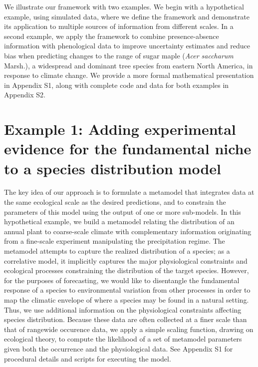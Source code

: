 \documentclass[11pt]{article}
\begin{document}
We illustrate our framework with two examples.
We begin with a hypothetical example, using simulated data, where we define the framework and demonstrate its application to multiple sources of information from different scales.
In a second example, we apply the framework to combine presence-absence information with phenological data to improve uncertainty estimates and reduce bias when predicting changes to the range of sugar maple (\emph{Acer saccharum} Marsh.), a widespread and dominant tree species from eastern North America, in response to climate change.
We provide a more formal mathematical presentation in Appendix S1, along with complete code and data for both examples in Appendix S2.

%
%
\section*{Example 1: Adding experimental evidence for the fundamental niche to a species distribution model}
The key idea of our approach is to formulate a metamodel that integrates data at the same ecological scale as the desired predictions, and to constrain the parameters of this model using the output of one or more sub-models.
In this hypothetical example, we build a metamodel relating the distribution of an annual plant to coarse-scale climate with complementary information originating from a fine-scale experiment manipulating the precipitation regime.
The metamodel attempts to capture the realized distribution of a species; as a correlative model, it implicitly captures the major physiological constraints and ecological processes constraining the distribution of the target species. 
However, for the purposes of forecasting, we would like to disentangle the fundamental response of a species to environmental variation from other processes in order to map the climatic envelope of where a species may be found in a natural setting.
Thus, we use additional information on the physiological constraints affecting species distribution.
Because these data are often collected at a finer scale than that of rangewide occurence data, we apply a simple scaling function, drawing on ecological theory, to compute the likelihood of a set of metamodel parameters given both the occurrence and the physiological data.
See Appendix S1 for procedural details and scripts for executing the model.
\end{document}
